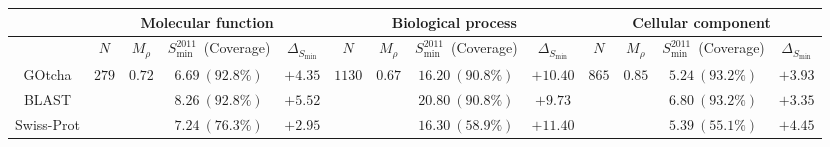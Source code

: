 \begin{tabular}{c|cccc|cccc|cccc}
\hline
& \multicolumn{4}{c|}{Molecular function}
& \multicolumn{4}{c}{Biological process}
& \multicolumn{4}{|c}{Cellular component} \\ \hline \hline
&
$N$ & $M_{\rho}$ & $S_{\min}^{2011}$~(Coverage) & $\Delta_{S_{\min}}$ &
$N$ & $M_{\rho}$ & $S_{\min}^{2011}$~(Coverage) & $\Delta_{S_{\min}}$ &
$N$ & $M_{\rho}$ & $S_{\min}^{2011}$~(Coverage) & $\Delta_{S_{\min}}$ \\ \hline 
GOtcha &
\multirow{3}{*}{$279$} & \multirow{3}{*}{$0.72$} & $6.69~(92.8\%)$ & $+4.35$ &
\multirow{3}{*}{$1130$} & \multirow{3}{*}{$0.67$} & $16.20~(90.8\%)$ & $+10.40$ &
\multirow{3}{*}{$865$} & \multirow{3}{*}{$0.85$} & $5.24~(93.2\%)$ & $+3.93$ \\
BLAST &
& & $8.26~(92.8\%)$ & $+5.52$ &
& & $20.80~(90.8\%)$ & $+9.73$ &
& & $6.80~(93.2\%)$ & $+3.35$ \\
Swiss-Prot &
& & $7.24~(76.3\%)$ & $+2.95$ &
& & $16.30~(58.9\%)$ & $+11.40$ &
& & $5.39~(55.1\%)$ & $+4.45$ \\
\hline
\end{tabular}

